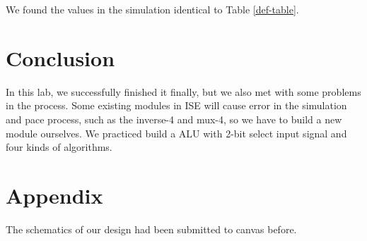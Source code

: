 \documentclass{article}
\begin{document}
We found the values in the simulation identical to Table \ref{def-table}.


\newpage

\section{Conclusion}
In this lab, we successfully finished it finally, but we also met with some problems in the process. Some existing modules in ISE will cause error in the simulation and pace process, such as the inverse-4 and mux-4, so we have to build a new module ourselves. We practiced build a ALU with 2-bit select input signal and four kinds of  algorithms.

\section{Appendix}
The schematics of our design had been submitted to canvas before.
\end{document}
